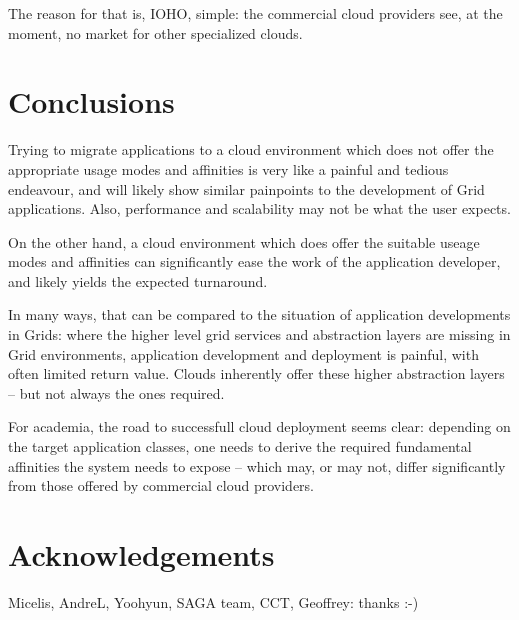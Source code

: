 \documentclass{article}
\begin{document}
  The reason for that is, IOHO, simple: the commercial cloud
  providers see, at the moment, no market for other specialized
  clouds.  




  
  
 


\section{Conclusions}
\label{sec:conclusion}

  Trying to migrate applications to a cloud environment which
  does not offer the appropriate usage modes and affinities is
  very like a painful and tedious endeavour, and will likely
  show similar painpoints to the development of Grid
  applications.  Also, performance and scalability may not be
  what the user expects.

  On the other hand, a cloud environment which does offer the
  suitable useage modes and affinities can significantly ease
  the work of the application developer, and likely yields the
  expected turnaround.

  In many ways, that can be compared to the situation of
  application developments in Grids: where the higher level grid
  services and abstraction layers are missing in Grid
  environments, application development and deployment is
  painful, with often limited return value.  Clouds inherently
  offer these higher abstraction layers -- but not always the
  ones required.

  For academia, the road to successfull cloud deployment seems
  clear: depending on the target application classes, one needs
  to derive the required fundamental affinities the system needs
  to expose -- which may, or may not, differ significantly from
  those offered by commercial cloud providers.

\section{Acknowledgements}
\label{sec:acks}

Micelis, AndreL, Yoohyun, SAGA team, CCT, Geoffrey: thanks :-)



\end{document}
